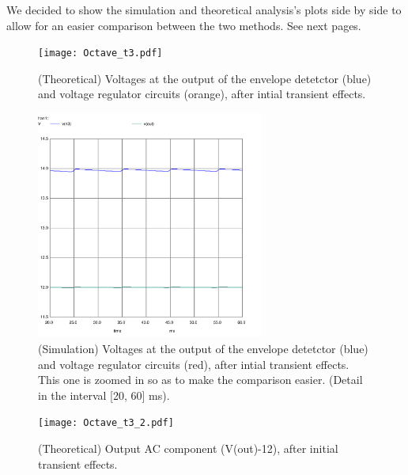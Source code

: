 We decided to show the simulation and theoretical analysis's plots side by side to allow for an easier comparison between the two methods. See next pages.

\clearpage


\begin{figure}[h] \centering
    \texttt{[image: Octave\_t3.pdf]}
    \caption{(Theoretical) Voltages at the output of the envelope detetctor (blue) and voltage regulator circuits (orange), after intial transient effects.}
    \label{fig:comp1_1}
  \end{figure}

\begin{figure}[h] \centering
    \includegraphics[height=7.5cm]{spice_t3_zoom.pdf}
    \caption{(Simulation) Voltages at the output of the envelope detetctor (blue) and voltage regulator circuits (red), after intial transient effects. This one is
    zoomed in so as to make the comparison easier. (Detail in the interval [20, 60] ms).}
    \label{fig:comp1_2}
  \end{figure}

      \begin{figure}[h] \centering
        \texttt{[image: Octave\_t3\_2.pdf]}
        \caption{(Theoretical) Output AC component (V(out)-12), after initial transient effects.}
        \label{fig:comp2_1}
      \end{figure}
    
